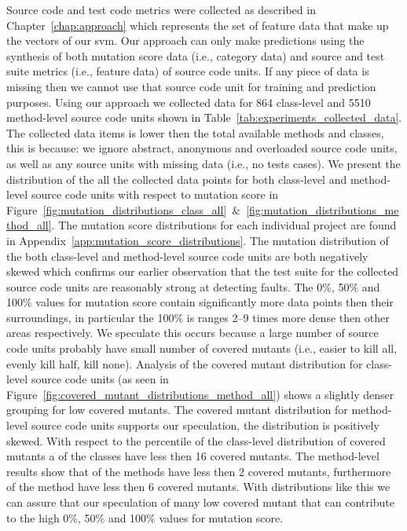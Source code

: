 Source code and test code metrics were collected as described in Chapter~\ref{chap:approach} which represents the set of feature data that make up the vectors of our \gls{svm}. Our approach can only make predictions using the synthesis of both mutation score data (i.e., category data) and source and test suite metrics (i.e., feature data) of source code units. If any piece of data is missing then we cannot use that source code unit for training and prediction purposes. Using our approach we collected data for 864 class-level and 5510 method-level source code units shown in Table~\ref{tab:experiments_collected_data}. The collected data items is lower then the total available methods and classes, this is because: we ignore abstract, anonymous and overloaded source code units, as well as any source units with missing data (i.e., no tests cases). We present the distribution of the all the collected data points for both class-level and method-level source code units with respect to mutation score in Figure~\ref{fig:mutation_distributions_class_all}~\&~\ref{fig:mutation_distributions_method_all}. The mutation score distributions for each individual project are found in Appendix~\ref{app:mutation_score_distributions}. The mutation distribution of the both class-level and method-level source code units are both negatively skewed which confirms our earlier observation that the test suite for the collected source code units are reasonably strong at detecting faults. The 0\%, 50\% and 100\% values for mutation score contain significantly more data points then their surroundings, in particular the 100\% is ranges 2--9 times more dense then other areas respectively. We speculate this occurs because a large number of source code units probably have small number of covered mutants (i.e., easier to kill all, evenly kill half, kill none). Analysis of the covered mutant distribution for class-level source code units (as seen in Figure~\ref{fig:covered_mutant_distributions_method_all}) shows a slightly denser grouping for low covered mutants. The covered mutant distribution for method-level source code units supports our speculation, the distribution is positively skewed. With respect to the percentile of the class-level distribution of covered mutants a  of the classes have less then 16 covered mutants. The method-level results show that  of the methods have less then 2 covered mutants, furthermore  of the method have less then 6 covered mutants. With distributions like this we can assure that our speculation of many low covered mutant that can contribute to the high 0\%, 50\% and 100\% values for mutation score.

